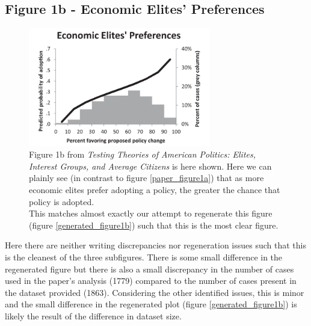 \documentclass[]{article}
\begin{document}
\subsection{Figure 1b - Economic Elites' Preferences}
\label{section_figure1b}
\begin{figure}[H]
	\begin{center}
		\includegraphics[width=300px]{./figures/paper/economic-elites-preferences.png}
	\end{center}	
	\caption{Figure 1b from \textit{Testing Theories of American Politics: Elites, Interest Groups, and Average Citizens} is here shown. Here we can plainly see (in contrast to figure \ref{paper_figure1a}) that as more economic elites prefer adopting a policy, the greater the chance that policy is adopted. \\This matches almost exactly our attempt to regenerate this figure (figure \ref{generated_figure1b}) such that this is the most clear figure.}
	\label{paper_figure1b}
\end{figure}

Here there are neither writing discrepancies nor regeneration issues such that this is the cleanest of the three subfigures.
There is some small difference in the regenerated figure but there is also a small discrepancy in the number of cases used in the paper's analysis (1779) compared to the number of cases present in the dataset provided (1863).
Considering the other identified issues, this is minor and the small difference in the regenerated plot (figure \ref{generated_figure1b}) is likely the result of the difference in dataset size.
\end{document}
